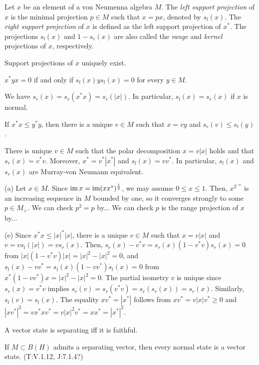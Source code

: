 \documentclass{../../large}
\begin{document}
\begin{prb}
Let $x$ be an element of a von Neumenna algebra $M$.
The \emph{left support projection} of $x$ is the minimal projection $p\in M$ such that $x=px$, denoted by $s_l(x)$.
The \emph{right support projection} of $x$ is defined as the left support projection of $x^*$.
The projections $s_l(x)$ and $1-s_r(x)$ are also called the \emph{range} and \emph{kernel} projections of $x$, respectively.
\begin{parts}
\item Support projections of $x$ uniquely exist.
\item $x^*yx=0$ if and only if $s_l(x)ys_l(x)=0$ for every $y\in M$.
\item We have $s_r(x)=s_r(x^*x)=s_r(|x|)$. In particular, $s_l(x)=s_r(x)$ if $x$ is normal.
\item If $x^*x\le y^*y$, then there is a unique $v\in M$ such that $x=vy$ and $s_r(v)\le s_l(y)$.
\item There is unique $v\in M$ such that the polar decomposition $x=v|x|$ holds and that $s_r(x)=v^*v$. Moreover, $x^*=v^*|x^*|$ and $s_l(x)=vv^*$. In particular, $s_l(x)$ and $s_r(x)$ are Murray-von Neumann equivalent.
\end{parts}
\end{prb}
\begin{pf}
(a)
Let $x\in M$.
Since $\operatorname{im} x=\operatorname{im}(xx^*)^{\frac12}$, we may assume $0\le x\le1$.
Then, $x^{2^{-n}}$ is an increasing sequence in $M$ bounded by one, so it converges strongly to some $p\in M_+$.
We can check $p^2=p$ by...
We can check $p$ is the range projection of $x$ by...


(e)
Since $x^*x\le|x|^*|x|$, there is a unique $v\in M$ such that $x=v|x|$ and $v=vs_l(|x|)=vs_r(x)$.
Then, $s_r(x)-v^*v=s_r(x)(1-v^*v)s_r(x)=0$ from $|x|(1-v^*v)|x|=|x|^2-|x|^2=0$, and $s_l(x)-vv^*=s_l(x)(1-vv^*)s_l(x)=0$ from $x^*(1-vv^*)x=|x|^2-|x|^2=0$.
The partial isometry $v$ is unique since $s_r(x)=v^*v$ implies $s_r(v)=s_r(v^*v)=s_r(s_r(x))=s_r(x)$.
Similarly, $s_l(v)=s_l(x)$.
The equality $xv^*=|x^*|$ follows from $xv^*=v|x|v^*\ge0$ and $|xv^*|^2=vx^*xv^*=v|x|^2v^*=xx^*=|x^*|^2$.
\end{pf}



\begin{prb}
\end{prb}


\begin{prb}
A vector state is separating iff it is faithful.

If $M\subset B(H)$ admits a separating vector, then every normal state is a vector state. (T:V.1.12, J:7.1.4?)
\end{prb}
\end{document}
